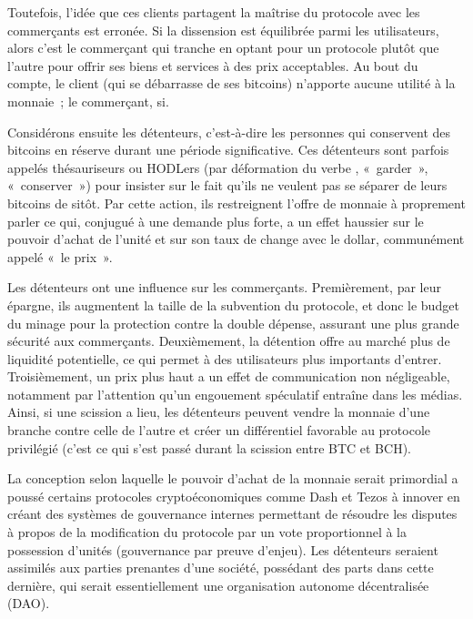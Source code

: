 Toutefois, l'idée que ces clients partagent la maîtrise du protocole avec les commerçants est erronée. Si la dissension est équilibrée parmi les utilisateurs, alors c'est le commerçant qui tranche en optant pour un protocole plutôt que l'autre pour offrir ses biens et services à des prix acceptables. Au bout du compte, le client (qui se débarrasse de ses bitcoins) n'apporte aucune utilité à la monnaie~; le commerçant, si.


Considérons ensuite les détenteurs, c'est-à-dire les personnes qui conservent des bitcoins en réserve durant une période significative. Ces détenteurs sont parfois appelés thésauriseurs ou HODLers (par déformation du verbe , «~garder~», «~conserver~») pour insister sur le fait qu'ils ne veulent pas se séparer de leurs bitcoins de sitôt. Par cette action, ils restreignent l'offre de monnaie à proprement parler ce qui, conjugué à une demande plus forte, a un effet haussier sur le pouvoir d'achat de l'unité et sur son taux de change avec le dollar, communément appelé «~le prix~».

Les détenteurs ont une influence sur les commerçants. Premièrement, par leur épargne, ils augmentent la taille de la subvention du protocole, et donc le budget du minage pour la protection contre la double dépense, assurant une plus grande sécurité aux commerçants. Deuxièmement, la détention offre au marché plus de liquidité potentielle, ce qui permet à des utilisateurs plus importants d'entrer. Troisièmement, un prix plus haut a un effet de communication non négligeable, notamment par l'attention qu'un engouement spéculatif entraîne dans les médias. Ainsi, si une scission a lieu, les détenteurs peuvent vendre la monnaie d'une branche contre celle de l'autre et créer un différentiel favorable au protocole privilégié (c'est ce qui s'est passé durant la scission entre BTC et BCH).

La conception selon laquelle le pouvoir d'achat de la monnaie serait primordial a poussé certains protocoles cryptoéconomiques comme Dash et Tezos à innover en créant des systèmes de gouvernance internes permettant de résoudre les disputes à propos de la modification du protocole par un vote proportionnel à la possession d'unités (gouvernance par preuve d'enjeu). Les détenteurs seraient assimilés aux parties prenantes d'une société, possédant des parts dans cette dernière, qui serait essentiellement une organisation autonome décentralisée (DAO).

